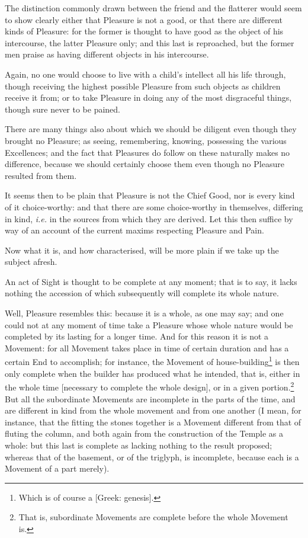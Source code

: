 The distinction commonly drawn between the friend and the flatterer would seem
to show clearly either that Pleasure is not a good, or that there are different
kinds of Pleasure: for the former is thought to have good as the object of his
intercourse, the latter Pleasure only; and this last is reproached, but the
former men praise as having different objects in his intercourse.

Again, no one would choose to live with a child’s intellect all his life
through, though receiving the highest possible Pleasure from such objects as
children receive it from; or to take Pleasure in doing any of the most
disgraceful things, though sure never to be pained.

There are many things also about which we should be diligent even though they
brought no Pleasure; as seeing, remembering, knowing, possessing the various
Excellences; and the fact that Pleasures do follow on these naturally makes no
difference, because we should certainly choose them even though no Pleasure
resulted from them.

It seems then to be plain that Pleasure is not the Chief Good, nor is every
kind of it choice-worthy: and that there are some choice-worthy in themselves,
differing in kind, \emph{i.e.} in the sources from which they are derived. Let
this then suffice by way of an account of the current maxims respecting
Pleasure and Pain.


Now what it is, and how characterised, will be more plain if we take up the
subject afresh.

An act of Sight is thought to be complete at any moment; that is to say, it
lacks nothing the accession of which subsequently will complete its whole
nature.

Well, Pleasure resembles this: because it is a whole, as one may say; and one
could not at any moment of time take a Pleasure whose whole nature would be
completed by its lasting for a longer time. And for this reason it is not a
Movement: for all Movement takes place in time of certain duration and has a
certain End to accomplish; for instance, the Movement of
house-building\footnote{Which is of course a [Greek: genesis].}
is then only complete when the builder has produced what he intended, that is,
either in the whole time [necessary to complete the whole design], or in a
given portion.\footnote{That is, subordinate Movements are complete before the whole Movement is.}
But all the subordinate Movements are incomplete in the parts of the time, and
are different in kind from the whole movement and from one another (I mean, for
instance, that the fitting the stones together is a Movement different from
that of fluting the column, and both again from the construction of the Temple
as a whole: but this last is complete as lacking nothing to the result
proposed; whereas that of the basement, or of the triglyph, is incomplete,
because each is a Movement of a part merely).

